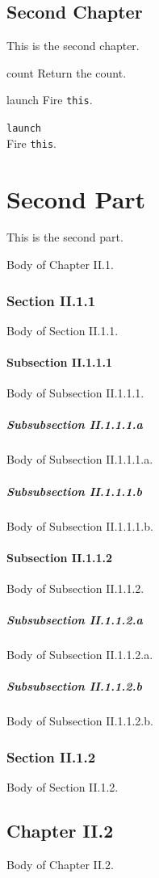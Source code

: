\documentclass[openright,twoside,11pt]{book}
\begin{document}
\chapter{Second Chapter}

This is the second chapter.



\begin{urbiscriptapi}
\item[count]Return the count.
\item[launch]
  Fire \lstinline|this|.
\item \lstinline|launch|~\\
  Fire \lstinline|this|.

\end{urbiscriptapi}

\part{Second Part}

This is the second part.

Body of Chapter II.1.

\section{Section II.1.1}
Body of Section II.1.1.

\subsection{Subsection II.1.1.1}
Body of Subsection II.1.1.1.

\subsubsection{Subsubsection II.1.1.1.a}
Body of Subsection II.1.1.1.a.

\subsubsection{Subsubsection II.1.1.1.b}
Body of Subsection II.1.1.1.b.

\subsection{Subsection II.1.1.2}
Body of Subsection II.1.1.2.

\subsubsection{Subsubsection II.1.1.2.a}
Body of Subsection II.1.1.2.a.

\subsubsection{Subsubsection II.1.1.2.b}
Body of Subsection II.1.1.2.b.

\section{Section II.1.2}
Body of Section II.1.2.

\chapter{Chapter II.2}
Body of Chapter II.2.
\end{document}
